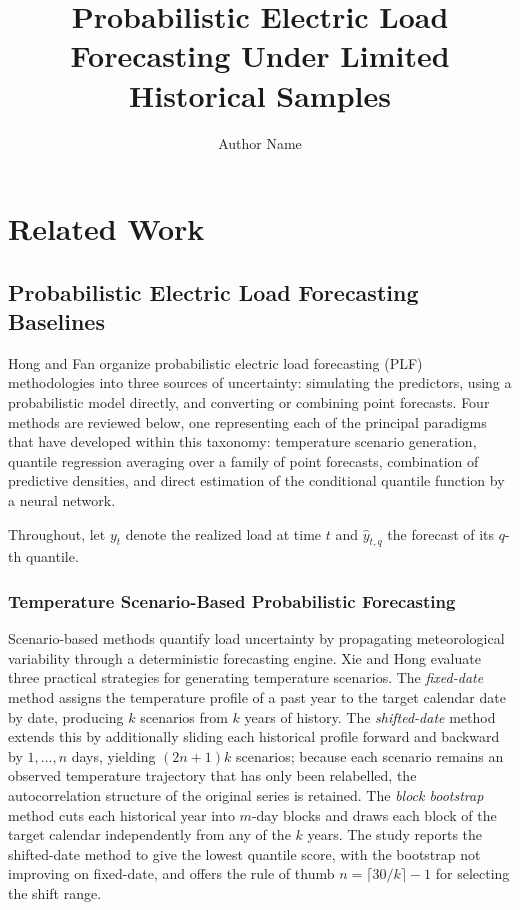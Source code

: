 \documentclass[10pt,journal,compsoc]{IEEEtran}
\begin{document}
\title{Probabilistic Electric Load Forecasting Under Limited Historical Samples}
\author{Author Name}

\maketitle

\section{Related Work}

\subsection{Probabilistic Electric Load Forecasting Baselines}
Hong and Fan \cite{hong2016probabilistic} organize probabilistic electric load forecasting
(PLF) methodologies into three sources of uncertainty: simulating the predictors, using a
probabilistic model directly, and converting or combining point forecasts. Four methods are
reviewed below, one representing each of the principal paradigms that have developed within
this taxonomy: temperature scenario generation, quantile regression averaging over a family
of point forecasts, combination of predictive densities, and direct estimation of the
conditional quantile function by a neural network.

Throughout, let $y_t$ denote the realized load at time $t$ and $\hat{y}_{t,q}$ the forecast of
its $q$-th quantile.

\subsubsection{Temperature Scenario-Based Probabilistic Forecasting}
Scenario-based methods quantify load uncertainty by propagating meteorological variability
through a deterministic forecasting engine. Xie and Hong \cite{xie2018temperature} evaluate
three practical strategies for generating temperature scenarios. The \emph{fixed-date} method
assigns the temperature profile of a past year to the target calendar date by date, producing
$k$ scenarios from $k$ years of history. The \emph{shifted-date} method extends this by
additionally sliding each historical profile forward and backward by $1,\dots,n$ days,
yielding $(2n+1)k$ scenarios; because each scenario remains an observed temperature
trajectory that has only been relabelled, the autocorrelation structure of the original
series is retained. The \emph{block bootstrap} method cuts each historical year into $m$-day
blocks and draws each block of the target calendar independently from any of the $k$ years.
The study reports the shifted-date method to give the lowest quantile score, with the
bootstrap not improving on fixed-date, and offers the rule of thumb
$n = \lceil 30/k \rceil - 1$ for selecting the shift range.
\end{document}
